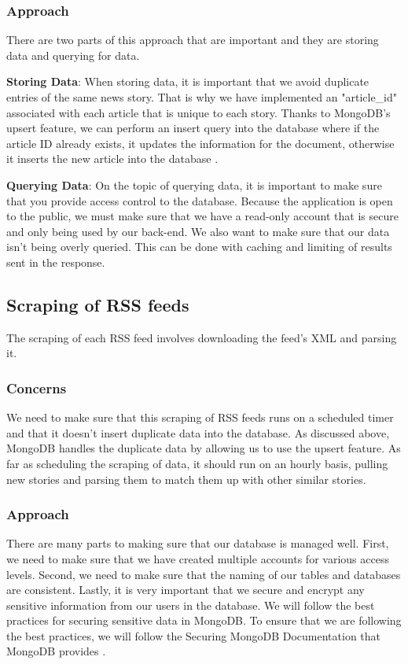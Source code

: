 \documentclass[onecolumn, draftclsnofoot,10pt, compsoc]{IEEEtran}
\begin{document}
\subsubsection{Approach}
There are two parts of this approach that are important and they are storing data and querying for data.

\hangindent=0.5cm \textbf{Storing Data}: When storing data, it is important that we avoid duplicate entries of the same news story. That is why we have implemented an "article\_id" associated with each article that is unique to each story. Thanks to MongoDB's upsert feature, we can perform an insert query into the database where if the article ID already exists, it updates the information for the document, otherwise it inserts the new article into the database \cite{mongo_upsert}. 

\hangindent=0.5cm \textbf{Querying Data}: On the topic of querying data, it is important to make sure that you provide access control to the database. Because the application is open to the public, we must make sure that we have a read-only account that is secure and only being used by our back-end. We also want to make sure that our data isn't being overly queried. This can be done with caching and limiting of results sent in the response.

\subsection{Scraping of RSS feeds}
The scraping of each RSS feed involves downloading the feed's XML and parsing it.
\subsubsection{Concerns}
We need to make sure that this scraping of RSS feeds runs on a scheduled timer and that it doesn't insert duplicate data into the database. As discussed above, MongoDB handles the duplicate data by allowing us to use the upsert feature. As far as scheduling the scraping of data, it should run on an hourly basis, pulling new stories and parsing them to match them up with other similar stories.
\subsubsection{Approach}
There are many parts to making sure that our database is managed well. First, we need to make sure that we have created multiple accounts for various access levels. Second, we need to make sure that the naming of our tables and databases are consistent. Lastly, it is very important that we secure and encrypt any sensitive information from our users in the database. We will follow the best practices for securing sensitive data in MongoDB. To ensure that we are following the best practices, we will follow the Securing MongoDB Documentation that MongoDB provides \cite{secure_mongo}.
\end{document}
